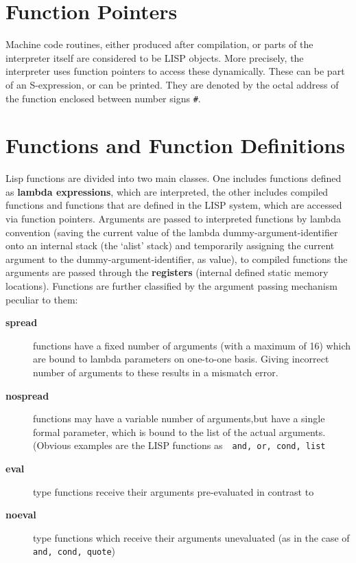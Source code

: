 \section{Function Pointers}
Machine code routines, either produced after compilation, or parts  of  the
interpreter  itself  are  considered to be LISP objects. More precisely, the
interpreter uses function pointers to access these dynamically.  These  can
be  part  of  an  S-expression,  or can be printed. They are denoted by the
octal address of the function enclosed between number signs {\tt \#}.



\section{Functions and Function Definitions}
Lisp  functions  are  divided into two main classes. One includes functions
defined as {\bf lambda  expressions},  which  are  interpreted,  the  other
includes  compiled  functions  and  functions  that are defined in the LISP
system, which are accessed via function pointers. Arguments are  passed  to
interpreted  functions  by  lambda convention (saving the current value  of
the lambda dummy-argument-identifier onto an internal  stack  (the  `alist'
stack)   and   temporarily   assigning   the   current   argument   to  the
dummy-argument-identifier, as value),
to compiled functions the arguments are passed through the {\bf  registers}
(internal   defined   static   memory  locations).  Functions  are  further
classified by the argument passing mechanism peculiar to them:
\begin{description}
\item[{\bf spread}] functions have a fixed  number  of  arguments  (with  a
                    maximum  of 16) which are bound to lambda parameters on
                    one-to-one basis. Giving incorrect number of  arguments
                    to these results in a mismatch error.
\item[{\bf nospread}] functions may have a variable number of arguments,but
                    have  a  single formal parameter, which is bound to the
                    list of the actual arguments. (Obvious examples are the
                    LISP functions as\ \ {\tt and, or, cond, list}
\item[{\bf eval}]   type functions receive their arguments pre-evaluated in
                    contrast to
\item[{\bf noeval}] type functions which receive their arguments unevaluated
                    (as in the case of {\tt and, cond, quote})
\end{description}
